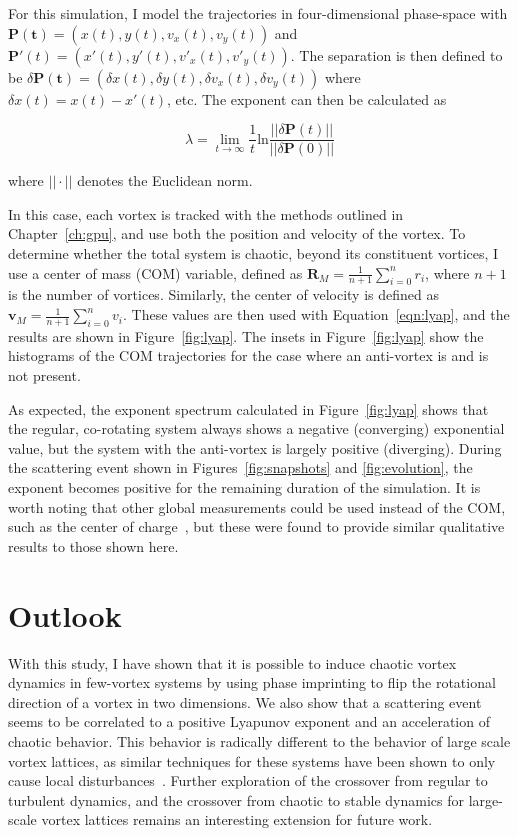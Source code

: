 For this simulation, I model the trajectories in four-dimensional phase-space with $\mathbf{P(t)} = (x(t), y(t), v_x(t), v_y(t))$ and $\mathbf{P}'(t) = (x'(t), y'(t), v'_x(t), v'_y(t))$.
The separation is then defined to be $\delta \mathbf{P(t)} = (\delta x(t), \delta y(t), \delta v_x(t), \delta v_y(t))$ where $\delta x(t) = x(t) - x'(t)$, etc.
The exponent can then be calculated as

\begin{equation}
\lambda = \lim_{t\to\infty}\frac{1}{t}\text{ln}\frac{||\delta\textbf{P}(t)||}{||\delta\textbf{P}(0)||}
\label{eqn:lyap}
\end{equation}

\noindent where $||\cdot||$ denotes the Euclidean norm.

In this case, each vortex is tracked with the methods outlined in Chapter~\ref{ch:gpu}, and use both the position and velocity of the vortex.
To determine whether the total system is chaotic, beyond its constituent vortices, I use a center of mass (COM) variable, defined as $\mathbf{R}_M = \frac{1}{n+1}\sum_{i=0}^nr_i$, where $n+1$ is the number of vortices.
Similarly, the center of velocity is defined as $\mathbf{v}_M = \frac{1}{n+1}\sum_{i=0}^nv_i$.
These values are then used with Equation~\eqref{eqn:lyap}, and the results are shown in Figure~\ref{fig:lyap}.
The insets in Figure~\ref{fig:lyap} show the histograms of the COM trajectories for the case where an anti-vortex is and is not present.

As expected, the exponent spectrum calculated in Figure~\ref{fig:lyap} shows that the regular, co-rotating system always shows a negative (converging) exponential value, but the system with the anti-vortex is largely positive (diverging).
During the scattering event shown in Figures~\ref{fig:snapshots} and \ref{fig:evolution}, the exponent becomes positive for the remaining duration of the simulation.
It is worth noting that other global measurements could be used instead of the COM, such as the center of charge~\cite{kyriakopoulos2014}, but these were found to provide similar qualitative results to those shown here.


\section{Outlook}

With this study, I have shown that it is possible to induce chaotic vortex dynamics in few-vortex systems by using phase imprinting to flip the rotational direction of a vortex in two dimensions.
We also show that a scattering event seems to be correlated to a positive Lyapunov exponent and an acceleration of chaotic behavior.
This behavior is radically different to the behavior of large scale vortex lattices, as similar techniques for these systems have been shown to only cause local disturbances~\cite{o2016topo}.
Further exploration of the crossover from regular to turbulent dynamics, and the crossover from chaotic to stable dynamics for large-scale vortex lattices remains an interesting extension for future work.

